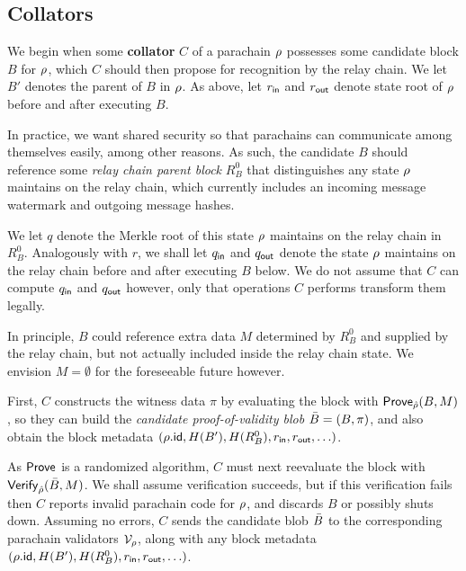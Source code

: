 \subsection{Collators} 
\label{sec:collators}

We begin when some {\bf collator} $C$ of a parachain $\rho$ possesses some candidate block $B$ for $\rho$, which $C$ should then propose for recognition by the relay chain.  We let $B'$ denotes the parent of $B$ in $\rho$.  As above, let $r_{\mathsf{in}}$ and $r_{\mathsf{out}}$ denote state root of $\rho$ before and after executing $B$.  

In practice, we want shared security so that parachains can communicate among themselves easily, among other reasons.  As such, the candidate $B$ should reference some {\em relay chain parent block} $R^0_B$ that distinguishes any state $\rho$ maintains on the relay chain, which currently includes an incoming message watermark and outgoing message hashes. 

We let $q$ denote the Merkle root of this state $\rho$ maintains on the relay chain in $R^0_B$.  Analogously with $r$, we shall let $q_{\mathsf{in}}$ and $q_{\mathsf{out}}$ denote the state $\rho$ maintains on the relay chain before and after executing $B$ below.  We do not assume that $C$ can compute $q_{\mathsf{in}}$ and $q_{\mathsf{out}}$ however, only that operations $C$ performs transform them legally.

In principle, $B$ could reference extra data $M$ determined by $R^0_B$ and supplied by the relay chain, but not actually included inside the relay chain state.  We envision $M = \emptyset$ for the foreseeable future however. 

First, $C$ constructs the witness data $\pi$ by evaluating the block with $\mathsf{Prove}_{\hat{\rho}}(B,M)$, so they can build the {\em candidate proof-of-validity blob} $\bar{B} = (B,\pi)$, and also obtain the block metadata $(\rho.\mathsf{id},H(B'),H(R^0_B),r_{\mathsf{in}},r_{\mathsf{out}},\ldots)$.  

As $\mathsf{Prove}$ is a randomized algorithm, $C$ must next reevaluate the block with $\mathsf{Verify}_{\hat{\rho}}(\bar{B},M)$.  We shall assume verification succeeds, but if this verification fails then $C$ reports invalid parachain code for $\rho$, and discards $B$ or possibly shuts down.  Assuming no errors, $C$ sends the candidate blob $\bar{B}$ to the corresponding parachain validators $\mathcal{V}_{\rho}$, along with any block metadata $(\rho.\mathsf{id},H(B'),H(R^0_B),r_{\mathsf{in}},r_{\mathsf{out}},\ldots)$. 





